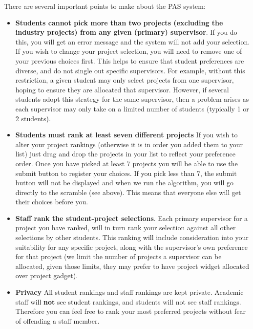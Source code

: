 \noindent There are several important points to make about the PAS system:
\begin{itemize}
\item {\bf Students cannot pick more than two projects (excluding the industry projects) from any given (primary) supervisor}.  If you do this, you will get an error message and the system will not add your selection.  If you wish to change your project selection, you will need to remove one of your previous choices first.   This helps to ensure that student preferences
  are diverse, and do not single out specific supervisors.  For
  example, without this restriction, a given student may only select
  projects from one supervisor, hoping to ensure they are allocated
  that supervisor.  However, if several students adopt this strategy
  for the same supervisor, then a problem arises as each supervisor
  may only take on a limited number of students (typically 1 or 2
  students).

\item {\bf Students must rank at least seven different projects}  If you wish
to alter your project rankings (otherwise it is in order you
added them to your list) just drag and drop the projects in your list to reflect
your preference order.  Once you have picked at least 7 projects you
will be able to use the submit button to register your choices.  If
you pick less than 7, the submit button will not be displayed and when we run the algorithm, you will go directly to the scramble
(see above).  This means that everyone else will get their choices
before you.

\item {\bf Staff rank the student-project selections}. Each primary
  supervisor for a project you have ranked, will in turn rank your
  selection against all other selections by other students. This
  ranking will include consideration into your suitability for any
  specific project, along with the supervisor's own preference for
  that project (we limit the number of projects a supervisor can be
  allocated, given those limits, they may prefer to have project widget allocated over
  project gadget).

\item {\bf Privacy} All student rankings and staff rankings are kept
  private.  Academic staff will \textbf{not} see student rankings, and students will not see staff rankings.  Therefore you can feel free to rank your most preferred projects without fear of offending a staff member.


\end{itemize}
